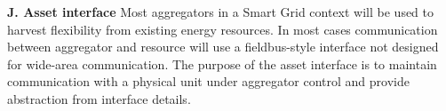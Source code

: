 \textbf{J. Asset interface}
Most aggregators in a Smart Grid context will be used to harvest flexibility from existing energy resources. In most cases communication between aggregator and resource will use a fieldbus-style interface not designed for wide-area communication. The purpose of the asset interface is to maintain communication with a physical unit under aggregator control and provide abstraction from interface details.
